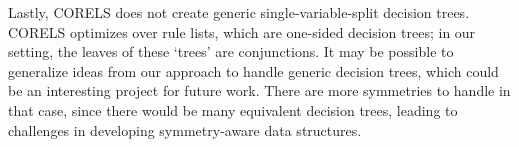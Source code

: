 \begin{arxiv}
Lastly, CORELS does not create generic single-variable-split decision trees.
%
CORELS optimizes over rule lists, which are one-sided decision trees;
in our setting, the leaves of these `trees' are conjunctions.
%
It may be possible to generalize ideas from our approach to handle generic
decision trees, which could be an interesting project for future work. There are more symmetries to handle in that case, since there would be many equivalent decision trees, leading to challenges in developing symmetry-aware data structures.

\end{arxiv}
